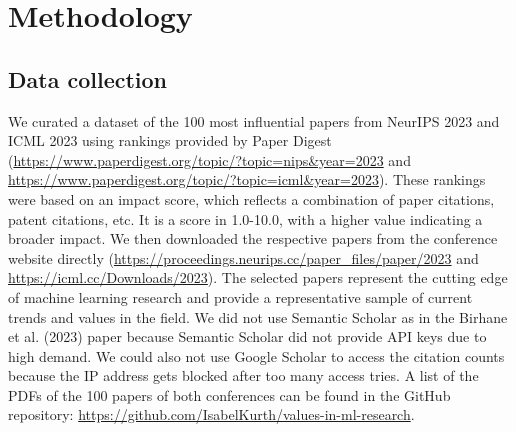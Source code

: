 \documentclass{article}
\begin{document}
\section{Methodology}
\subsection{Data collection}
We curated a dataset of the 100 most influential papers from NeurIPS 2023 and ICML 2023 using rankings provided by Paper Digest 
(\url{https://www.paperdigest.org/topic/?topic=nips&year=2023} and \url{https://www.paperdigest.org/topic/?topic=icml&year=2023}). 
These rankings were based on an impact score, which reflects a combination of paper citations, patent citations, etc. It is a score in 1.0-10.0, 
with a higher value indicating a broader impact. We then downloaded the respective papers from the conference website directly 
(\url{https://proceedings.neurips.cc/paper_files/paper/2023} and \url{https://icml.cc/Downloads/2023}). 
The selected papers represent the cutting edge of machine 
learning research and provide a representative sample of current trends and values in the field. We did not use Semantic Scholar as in the Birhane et 
al. (2023) paper because Semantic Scholar did not provide API keys due to high demand. We could also not use Google Scholar to access the citation 
counts because the IP address gets blocked after too many access tries. A list of the PDFs of the 100 papers of both conferences can be found in the 
GitHub repository: \url{https://github.com/IsabelKurth/values-in-ml-research}.
\end{document}
